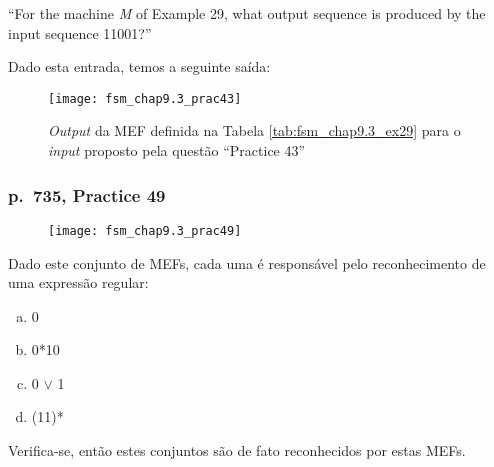 ``For the machine \textit{M} of Example 29, what output sequence is produced by
the input sequence 11001?''

Dado esta entrada, temos a seguinte saída:
\begin{figure}[H]
    \centering
    \texttt{[image: fsm\_chap9.3\_prac43]}
    \caption{
        \textit{Output} da MEF definida na Tabela \ref{tab:fsm_chap9.3_ex29}
        para o \textit{input} proposto pela questão ``Practice 43''
    }
    \label{fig:fsm_chap9.3_prac43}
\end{figure}

\subsubsection*{p.\ 735, Practice 49}

\begin{figure}[H]
    \centering
    \texttt{[image: fsm\_chap9.3\_prac49]}
    \caption{\cite[p.\ 735, Practice 49]{judith}}
    \label{fig:fsm_chap9.3_prac49}
\end{figure}

Dado este conjunto de MEFs, cada uma é responsável pelo reconhecimento de uma
expressão regular:

\begin{multicols}{4}
    \begin{enumerate}[(a)]
        \item 0
        \item 0*10
        \item 0 $\lor$ 1
        \item (11)*
    \end{enumerate}
\end{multicols}

\noindent
Verifica-se, então estes conjuntos são de fato reconhecidos por estas MEFs.

